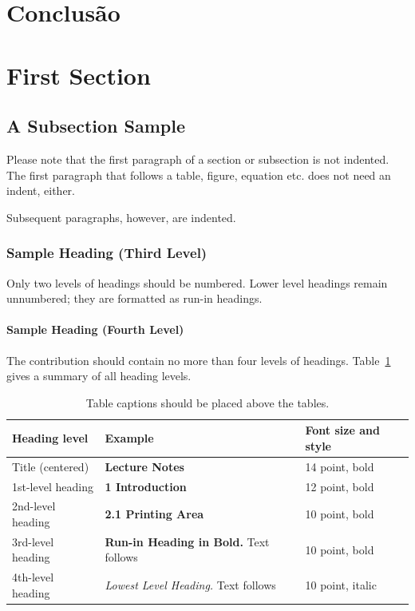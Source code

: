 \documentclass[runningheads]{llncs}
\begin{document}
\section{Conclusão}


\section{First Section}
\subsection{A Subsection Sample}
Please note that the first paragraph of a section or subsection is
not indented. The first paragraph that follows a table, figure,
equation etc. does not need an indent, either.

Subsequent paragraphs, however, are indented.

\subsubsection{Sample Heading (Third Level)} Only two levels of
headings should be numbered. Lower level headings remain unnumbered;
they are formatted as run-in headings.

\paragraph{Sample Heading (Fourth Level)}
The contribution should contain no more than four levels of
headings. Table~\ref{tab1} gives a summary of all heading levels.

\begin{table}
\caption{Table captions should be placed above the
tables.}\label{tab1}
\begin{tabular}{|l|l|l|}
\hline
Heading level &  Example & Font size and style\\
\hline
Title (centered) &  {\Large\bfseries Lecture Notes} & 14 point, bold\\
1st-level heading &  {\large\bfseries 1 Introduction} & 12 point, bold\\
2nd-level heading & {\bfseries 2.1 Printing Area} & 10 point, bold\\
3rd-level heading & {\bfseries Run-in Heading in Bold.} Text follows & 10 point, bold\\
4th-level heading & {\itshape Lowest Level Heading.} Text follows & 10 point, italic\\
\hline
\end{tabular}
\end{table}
\end{document}
